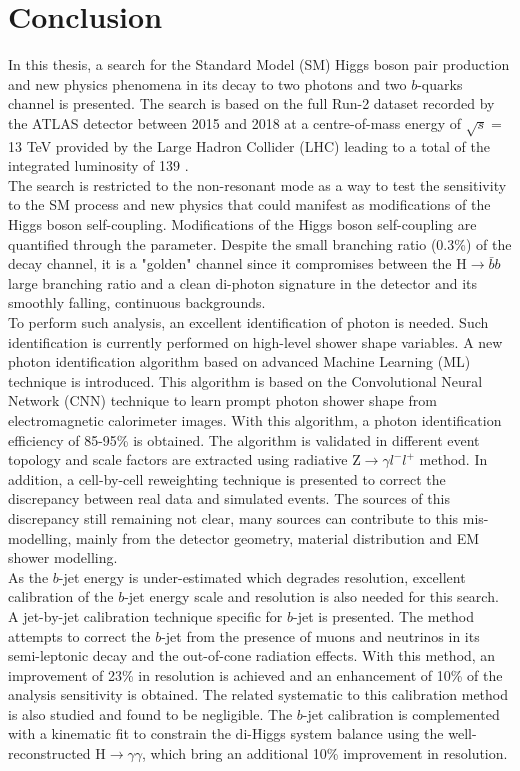 \newpage
\chapter{Conclusion}

In this thesis, a search for the Standard Model (SM) Higgs boson pair production and new physics phenomena in its decay to two photons and two $b$-quarks channel is presented. The search is based on the full Run-2 dataset recorded by the ATLAS detector between 2015 and 2018 at a centre-of-mass energy of $\sqrt{s} = $ 13 TeV provided by the Large Hadron Collider (LHC) leading to a total of the integrated luminosity of 139 \ifb.  \\

The search is restricted to the non-resonant mode as a way to test the sensitivity to the SM process and new physics that could manifest as modifications of the Higgs boson self-coupling. Modifications of the Higgs boson self-coupling are quantified through the \kl parameter. Despite the small branching ratio (0.3\%) of the \bbyy decay channel, it is a "golden" channel since it compromises between the H$\to\bar{b}b$ large branching ratio and a clean di-photon signature in the detector and its smoothly falling, continuous backgrounds. \\

To perform such analysis, an excellent identification of photon is needed. Such identification is currently performed on high-level shower shape variables. A new photon identification algorithm based on advanced Machine Learning (ML) technique is introduced. This algorithm is based on the Convolutional Neural Network (CNN) technique to learn prompt photon shower shape from electromagnetic calorimeter images. With this algorithm, a photon identification efficiency of 85-95\% is obtained. The algorithm is validated in different event topology and scale factors are extracted using radiative Z$\to\gamma l^-l^+$ method. In addition, a cell-by-cell reweighting technique is presented to correct the discrepancy between real data and simulated events. The sources of this discrepancy still remaining not clear, many sources can contribute to this mis-modelling, mainly from the detector geometry, material distribution and EM shower modelling. \\

As the $b$-jet energy is under-estimated which degrades \mbb resolution, excellent calibration of the $b$-jet energy scale and resolution is also needed for this search. A jet-by-jet calibration technique specific for $b$-jet is presented. The method attempts to correct the $b$-jet from the presence of muons and neutrinos in its semi-leptonic decay and the out-of-cone radiation effects. With this method, an improvement of 23\% in \mbb resolution is achieved and an enhancement of 10\% of the \HHyybb analysis sensitivity is obtained. The related systematic to this calibration method is also studied and found to be negligible. The $b$-jet calibration is complemented with a kinematic fit to constrain the di-Higgs system balance using the well-reconstructed H$\to\gamma\gamma$, which bring an additional 10\% improvement in \mbb resolution. \\


